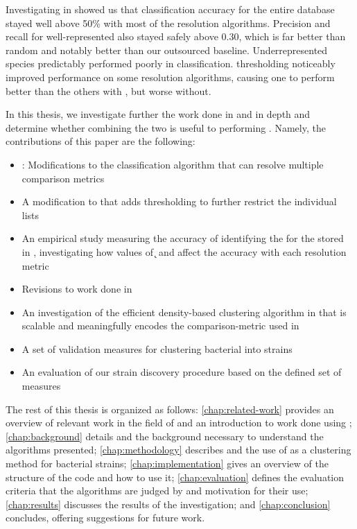 Investigating \krap{} in \cite{DBLP:conf/bibm/McGovernDKBVG15} showed us that classification accuracy for the entire database stayed well above 50\% with most of the resolution algorithms.
Precision and recall for well-represented \spec{} also stayed safely above 0.30, which is far better than random and notably better than our outsourced baseline.
Underrepresented species predictably performed poorly in classification.
\a{} thresholding noticeably improved performance on some resolution algorithms, causing one to perform better than the others with \a{}, but worse without.



In this thesis, we investigate further the work done in \cite{DBLP:conf/bibm/McGovernDKBVG15} and \cite{DBLP:conf/bcb/McGovernJDBKV16} in depth and determine whether combining the two is useful to performing \mst{}.
Namely, the contributions of this paper are the following:
\begin{itemize}
    \item \krapmed{}: Modifications to the \kNN{} classification algorithm that can resolve multiple comparison metrics
    \item A modification to \kNN{} that adds \a{} thresholding to further restrict the individual \kNN{} lists
    \item An empirical study measuring the accuracy of identifying the \spec{} for the \ecoli{} \isols{} stored in \cplop{}, investigating how values of \k{} and \a{} affect the accuracy with each resolution metric
    \item Revisions to work done in \cite{DBLP:conf/bibm/McGovernDKBVG15}
    \item An investigation of the efficient density-based clustering algorithm in \cite{johnson2015density} that is scalable and meaningfully encodes the comparison-metric used in \cplop{}
    \item A set of validation measures for clustering bacterial \isols{} into strains
    \item An evaluation of our strain discovery procedure based on the defined set of measures
\end{itemize}

The rest of this thesis is organized as follows:
\autoref{chap:related-work} provides an overview of relevant work in the field of \mst{} and an introduction to work done using \cplop{};
\autoref{chap:background} details \cplop{} and the background necessary to understand the algorithms presented;
\autoref{chap:methodology} describes \krap{} and the use of \dbscan{} as a clustering method for bacterial strains;
\autoref{chap:implementation} gives an overview of the structure of the code and how to use it;
\autoref{chap:evaluation} defines the evaluation criteria that the algorithms are judged by and motivation for their use;
\autoref{chap:results} discusses the results of the investigation;
and
\autoref{chap:conclusion} concludes, offering suggestions for future work.